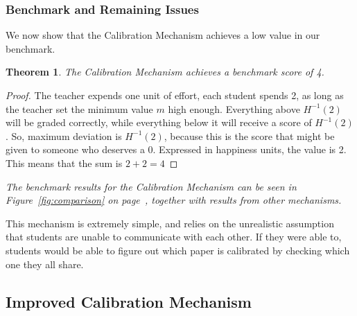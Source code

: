 \documentclass[12pt, Arial]{article}
\newtheorem{theorem}{Theorem}
\begin{document}
\subsubsection{Benchmark and Remaining Issues}
We now show that the Calibration Mechanism achieves a low value in our benchmark.\\
\begin{theorem}
The Calibration Mechanism achieves a benchmark score of 4.
\end{theorem}
\begin{proof}
The teacher expends one unit of effort, each student spends 2, as long as the teacher set the minimum value $m$ high enough.
Everything above $H^{-1}(2)$ will be graded correctly, while everything below it will receive a score of $H^{-1}(2)$.
So, maximum deviation is $H^{-1}(2)$, because this is the score that might be given to someone who deserves a 0. Expressed in happiness units, the value is 2. This means that the sum is $2+2=4$
\end{proof}

\emph{The benchmark results for the Calibration Mechanism can be seen in Figure~\ref{fig:comparison} on page~\pageref{fig:comparison}, together with results from other mechanisms.}

This mechanism is extremely simple, and relies on the unrealistic assumption that students are unable to communicate with each other. If they were able to, students would be able to figure out which paper is calibrated by checking which one they all share.
\subsection{Improved Calibration Mechanism}
\end{document}
